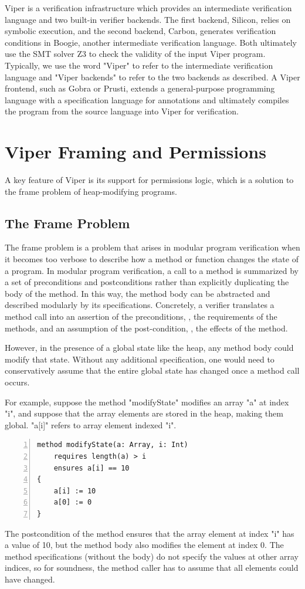 \documentclass[msc,oneside]{ubcthesis}
\theoremstyle{definition}
\begin{document}
Viper is a verification infrastructure which provides an intermediate verification language and two built-in verifier backends. The first backend, Silicon, relies on symbolic execution, and the second backend, Carbon, generates verification conditions in Boogie, another intermediate verification language. Both ultimately use the SMT solver Z3 to check the validity of the input Viper program. Typically, we use the word "Viper" to refer to the intermediate verification language and "Viper backends" to refer to the two backends as described. A Viper frontend, such as Gobra or Prusti, extends a general-purpose programming language with a specification language for annotations and ultimately compiles the program from the source language into Viper for verification. 

\section{Viper Framing and Permissions}
A key feature of Viper is its support for permissions logic, which is a solution to the frame problem of heap-modifying programs.

\subsection{The Frame Problem}
The frame problem is a problem that arises in modular program verification when it becomes too verbose to describe how a method or function changes the state of a program. In modular program verification, a call to a method is summarized by a set of preconditions and postconditions rather than explicitly duplicating the body of the method. In this way, the method body can be abstracted and described modularly by its specifications.  Concretely, a verifier translates a method call into an assertion of the preconditions, \ie, the requirements of the methods, and an assumption of the post-condition, \ie, the effects of the method. 

However, in the presence of a global state like the heap, any method body could modify that state. Without any additional specification, one would need to conservatively assume that the entire global state has changed once a method call occurs. 

For example, suppose the method "modifyState" modifies an array "a" at index "i", and suppose that the array elements are stored in the heap, making them global. "a[i]" refers to array element indexed "i".
\begin{lstlisting}[language=silver,numbers=left, firstnumber=1, stepnumber=1]
method modifyState(a: Array, i: Int)
    requires length(a) > i
    ensures a[i] == 10
{
    a[i] := 10
    a[0] := 0
}
\end{lstlisting}
The postcondition of the method ensures that the array element at index "i" has a value of 10, but the method body also modifies the element at index 0. The method specifications (without the body) do not specify the values at other array indices, so for soundness, the method caller has to assume that all elements could have changed.
\end{document}
